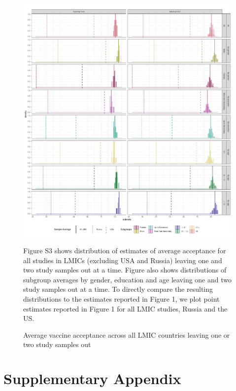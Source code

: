 \documentclass[
  12pt,
]{article}
\begin{document}
\begin{figure}[!ht]
\caption{Average vaccine acceptance across all LMIC countries leaving one or two study samples out
 \label{fig:mainloo}}

\includegraphics{paper_files/figure-latex/mainloo-1.pdf}

\scriptsize{Figure S3 shows distribution of estimates of average acceptance for all studies in LMICs (excluding USA and Russia) leaving one and two study samples out at a time. Figure also shows distributions of subgroup averages by gender, education and age leaving one and two study samples out at a time. To directly compare the resulting distributions to the estimates reported in Figure 1, we plot point estimates reported in Figure 1 for all LMIC studies, Russia and the US.}
\end{figure}

\pagebreak

\clearpage

\hypertarget{supplementary-appendix}{%
\section*{Supplementary Appendix}\label{supplementary-appendix}}
\end{document}
